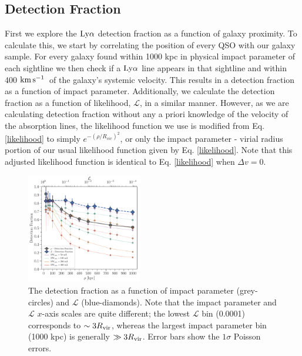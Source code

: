 \documentclass[twocolumn,tighten]{aastex62}
\newcommand{\kms}{$\rm km\, s^{-1}$}
\begin{document}
\subsection{Detection Fraction}
First we explore the $\rm Ly\alpha$ detection fraction as a function of galaxy proximity. To calculate this, we start by correlating the position of every QSO with our galaxy sample. For every galaxy found within 1000 kpc in physical impact parameter of each sightline we then check if a $\rm Ly\alpha$ line appears in that sightline and within 400 \kms~of the galaxy's systemic velocity. This results in a detection fraction as a function of impact parameter. Additionally, we calculate the detection fraction as a function of likelihood, $\mathcal{L}$, in a similar manner. However, as we are calculating detection fraction without any a priori knowledge of the velocity of the absorption lines, the likelihood function we use is modified from Eq. \ref{likelihood} to simply $e^{-(\rho/R_{vir})^2}$, or only the impact parameter - virial radius portion of our usual likelihood function given by Eq. \ref{likelihood}. Note that this adjusted likelihood function is identical to Eq. \ref{likelihood} when $\Delta v = 0$. 

\begin{figure}[t!]
        \centering
        \vspace{0pt}
        \includegraphics[width=0.45\textwidth]{detection_fraction_min0_50_100_200_300_both_alt2.pdf}
        \caption{\small{The detection fraction as a function of impact parameter (grey-circles) and $\mathcal{L}$ (blue-diamonds). Note that the impact parameter and $\mathcal{L}$ $x$-axis scales are quite different; the lowest $\mathcal{L}$ bin (0.0001) corresponds to $\sim 3 R_{\rm vir}$, whereas the largest impact parameter bin (1000 kpc) is generally $\gg 3 R_{\rm vir}$. Error bars show the $1\sigma$ Poisson errors.}}
        \vspace{0pt}
        \label{detection_fraction}
\end{figure}
\end{document}
